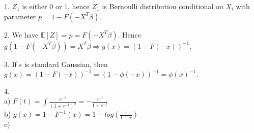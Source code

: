 \documentclass[10pt]{article}
\newenvironment{problem}[2][Problem]{\begin{trivlist}
\item[\hskip \labelsep {\bfseries #1}\hskip \labelsep {\bfseries #2.}]}{\end{trivlist}}
\begin{document}
\begin{problem}{3}
\item 1. $Z_{1}$ is either 0 or 1, hence $Z_{1}$ is Bernoulli distribution conditional on $X_{i}$ with parameter $p=1-F(-X^{T}\beta)$.
\item 2. We have $\mathbb{E}[Z]=p=F(-X^{T}\beta)$. Hence $g(1-F(-X^{T}\beta)) = X^{T}\beta \Rightarrow g(x)= (1-F(-x))^{-1}$.
\item 3. If $\epsilon$ is standard Gaussian, then  $g(x)=(1-F(-x))^{-1}=(1-\phi(-x))^{-1}=\phi(x)^{-1}$.
\item 4. \\
a) $F(t)= \int \frac{e^{-t}}{(1+e^{-1})^2} = -\frac{e^{-t}}{1+e^{-t}}$\\
b) $g(x)= 1-F^{-1}(x)=1-log(\frac{x}{1-x})$\\
c) 




\end{problem}
\end{document}

